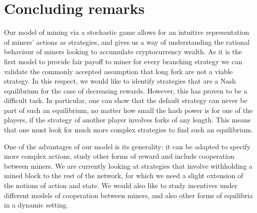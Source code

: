 \section{Concluding remarks}
\label{sec-con-r}

Our model of mining via a stochastic game allows for an intuitive representation of miners' actions as strategies, 
and gives us a way of understanding the rational behaviour of miners looking to accumulate cryptocurrency wealth. As it is the first model to provide fair payoff to miner for every branching strategy we can validate the commonly accepted assumption that long fork are not a viable strategy.
In this respect, we would like to identify strategies that are a Nash equilibrium for the case of decreasing rewards. However, this has proven 
to be a difficult task. In particular, one can show that the default strategy can never be part of such an 
equilibrium, no matter how small the hash power is for one of the players, if the strategy of another player involves forks of any length. 
This means that one must look for much more complex strategies to find such an equilibrium. 

One of the advantages of our model is its generality: it can be adapted to specify more complex 
actions, study other forms of reward and include cooperation between miners. 
We are currently looking at strategies that involve withholding 
a mined block to the rest of the network, for which we need a slight extension of the notions of action and state. 
We would also like to study incentives under different models of cooperation between miners, and 
also other forms of equilibria in a dynamic setting. 

